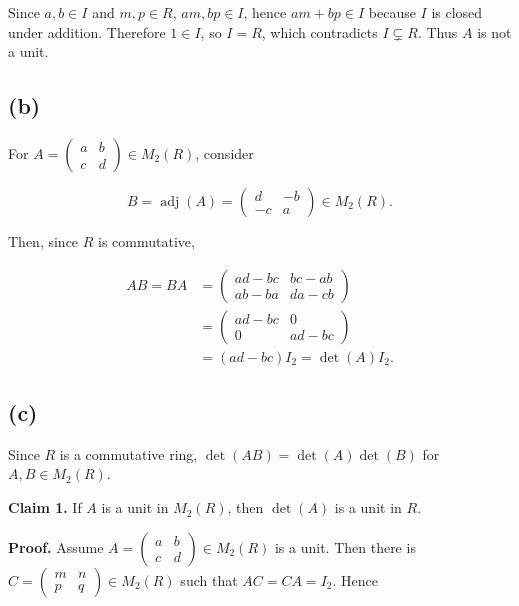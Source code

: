 Since \(a,b \in I\) and \(m,p \in R\), \(am,bp \in I\), hence \(am + bp \in I\) because \(I\) is closed under addition. Therefore \(1 \in I\), so \(I = R\), which contradicts \(I \subsetneq R\). Thus \(A\) is not a unit.

\subsection{(b)}

For \(A = \begin{pmatrix}
a & b \\
c & d
\end{pmatrix} \in M_{2}(R)\), consider

\[B = \operatorname{adj}(A) = \begin{pmatrix}
d & {- b} \\
{- c} & a
\end{pmatrix} \in M_{2}(R).\]

Then, since \(R\) is commutative,

\[\begin{matrix}
{AB = BA} & {= \begin{pmatrix}
{ad - bc} & {bc - ab} \\
{ab - ba} & {da - cb}
\end{pmatrix}} \\
 & {= \begin{pmatrix}
{ad - bc} & 0 \\
0 & {ad - bc}
\end{pmatrix}} \\
 & {= \left( {ad - bc} \right)I_{2} = \det(A)I_{2}.}
\end{matrix}\]

\subsection{(c)}

Since \(R\) is a commutative ring, \(\det\left( {AB} \right) = \det(A)\det(B)\) for \(A,B \in M_{2}(R)\).

\textbf{Claim 1.} If \(A\) is a unit in \(M_{2}(R)\), then \(\det(A)\) is a unit in \(R\).

\textbf{Proof.} Assume \(A = \begin{pmatrix}
a & b \\
c & d
\end{pmatrix} \in M_{2}(R)\) is a unit. Then there is \(C = \begin{pmatrix}
m & n \\
p & q
\end{pmatrix} \in M_{2}(R)\) such that \(AC = CA = I_{2}\). Hence

